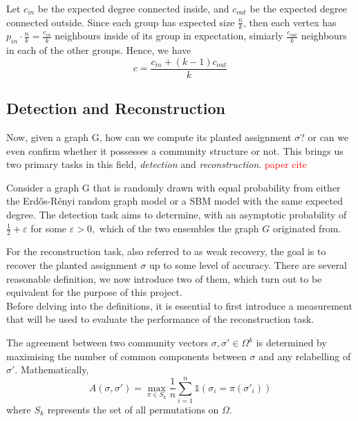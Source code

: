 Let $c_{in}$ be the expected degree connected inside, and $c_{out}$ be the expected degree connected outside. Since each group has expected size $\frac{n}{k}$, then each vertex has $p_{in}\cdot \frac{n}{k}=\frac{c_{in}}{k}$ neighbours inside of its group in expectation, simiarly $\frac{c_{out}}{k}$ neighbours in each of the other groups. Hence, we have\begin{equation}
    c=\frac{c_{in}+(k-1)c_{out}}{k}
\end{equation}

\subsection{Detection and Reconstruction}
Now, given a graph G, how can we compute its planted assignment $\sigma$? or  can we even confirm whether it possesses a community structure or not. This brings us two primary tasks in this field, \textit{detection} and \textit{reconstruction}.
\textcolor{red}{paper cite}
\begin{definition}
    Consider a graph G that is randomly drawn with equal probability from either the Erd\H{o}s-R\'{e}nyi random graph model or a SBM model with the same expected degree. The detection task aims to determine, with an asymptotic probability of $\frac{1}{2}+\varepsilon$ for some $\varepsilon > 0,$ which of the two ensembles the graph $G$ originated from.
\end{definition}
For the reconstruction task, also referred to as weak recovery, the goal is to recover the planted assignment $\sigma$ up to some level of accuracy. There are several reasonable definition, we now introduce two of them, which turn out to be equivalent for the purpose of this project.\\
Before delving into the definitions, it is essential to first introduce a measurement that will be used to evaluate the performance of the reconstruction task.
\begin{definition}
The agreement between two community vectors $\sigma, \sigma'\in\Omega^k$ is determined by maximising the number of common components between $\sigma$ and any relabelling of $\sigma'.$ Mathematically, \begin{equation}
    A(\sigma, \sigma')=\max_{\pi \in S_k} \frac{1}{n} \sum_{i=1}^{n} \mathbb{1}(\sigma_i = \pi(\sigma'_i))
\end{equation}
where $S_k$ represents the set of all permutations on $\Omega$.
\end{definition}
